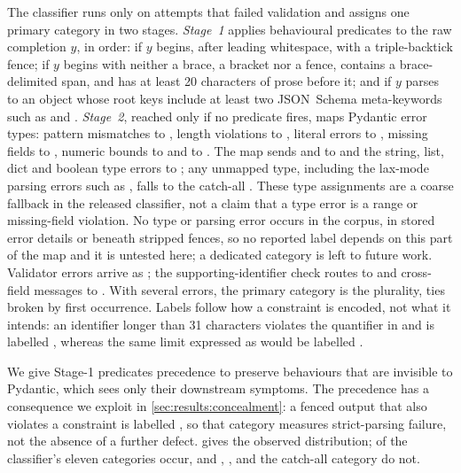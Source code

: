 The classifier runs only on attempts that failed validation and assigns
one primary category in two stages. \emph{Stage~1} applies behavioural
predicates to the raw completion $y$, in order:  if
$y$ begins, after leading whitespace, with a triple-backtick fence;
 if $y$ begins with neither a brace, a bracket nor a
fence, contains a brace-delimited span, and has at least 20 characters of
prose before it; and  if $y$ parses to an object
whose root keys include at least two JSON~Schema meta-keywords such as
 and . \emph{Stage~2}, reached only if no
predicate fires, maps Pydantic error types: pattern mismatches to
, length violations to , literal
errors to , missing fields to ,
numeric bounds to  and  to
. The map sends  and  to
 and the string, list, dict and boolean type errors to
; any unmapped type, including the lax-mode parsing
errors such as , falls to the catch-all
. These type assignments are a coarse
fallback in the released classifier, not a claim that a type error is a
range or missing-field violation. No type or parsing error occurs in the
corpus, in stored error details or beneath stripped fences, so no
reported label depends on this part of the map and it is untested here;
a dedicated  category is left to future work. Validator errors arrive as ; the
supporting-identifier check routes to  and cross-field
messages to . With several errors, the primary
category is the plurality, ties broken by first occurrence.
Labels follow how a constraint is encoded, not what it intends: an
identifier longer than 31 characters violates the quantifier in
\idpattern{} and is labelled , whereas the same
limit expressed as  would be labelled
.

We give Stage-1 predicates precedence to preserve behaviours that are
invisible to Pydantic, which sees only their downstream symptoms. The
precedence has a consequence we exploit in
\cref{sec:results:concealment}: a fenced output that also violates a
constraint is labelled , so that category measures
strict-parsing failure, not the absence of a further defect.
 gives the observed distribution;
 of the classifier's eleven categories
occur, and , ,
 and the catch-all category do not.

